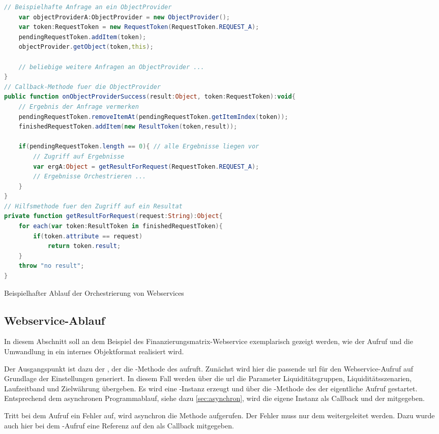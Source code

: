 \begin{onehalfspacing}
\begin{programm}[h]
\begin{lstlisting}[language=ActionScript]
	// Beispielhafte Anfrage an ein ObjectProvider
	var objectProviderA:ObjectProvider = new ObjectProvider();
	var token:RequestToken = new RequestToken(RequestToken.REQUEST_A);
	pendingRequestToken.addItem(token);
	objectProvider.getObject(token,this);
	
	// beliebige weitere Anfragen an ObjectProvider ...
}
// Callback-Methode fuer die ObjectProvider
public function onObjectProviderSuccess(result:Object, token:RequestToken):void{
	// Ergebnis der Anfrage vermerken
	pendingRequestToken.removeItemAt(pendingRequestToken.getItemIndex(token));
	finishedRequestToken.addItem(new ResultToken(token,result));
	
	if(pendingRequestToken.length == 0){ // alle Ergebnisse liegen vor
		// Zugriff auf Ergebnisse
		var ergA:Object = getResultForRequest(RequestToken.REQUEST_A);
		// Ergebnisse Orchestrieren ...
	}
}
// Hilfsmethode fuer den Zugriff auf ein Resultat	
private function getResultForRequest(request:String):Object{
	for each(var token:ResultToken in finishedRequestToken){
		if(token.attribute == request)
			return token.result;
	}
	throw "no result";
}
\end{lstlisting}
\caption{Beispielhafter Ablauf der Orchestrierung von Webservices\label{listing:orchestrierung:webservices}}
\end{programm}


\subsection{Webservice-Ablauf}
In diesem Abschnitt soll an dem Beispiel des Finanzierungsmatrix-Webservice exemplarisch gezeigt werden, wie der Aufruf und die Umwandlung in ein internes Objektformat realisiert wird.

Der Ausgangspunkt ist dazu der , der die -Methode des  aufruft. Zunächst wird hier die passende \gls{url} für den Webservice-Aufruf auf Grundlage der Einstellungen generiert. In diesem Fall werden über die \gls{url} die Parameter Liquiditätsgruppen, Liquiditätsszenarien, Laufzeitband und Zielwährung übergeben. Es wird eine -Instanz erzeugt und über die -Methode des  der eigentliche Aufruf gestartet. Entsprechend dem asynchronen Programmablauf, siehe dazu \vref{sec:asynchron}, wird die eigene Instanz als Callback und der  mitgegeben.

Tritt bei dem Aufruf ein Fehler auf, wird asynchron die Methode  aufgerufen. Der Fehler muss nur dem  weitergeleitet werden. Dazu wurde auch hier bei dem -Aufruf eine Referenz auf den  als Callback mitgegeben.


\end{onehalfspacing}
